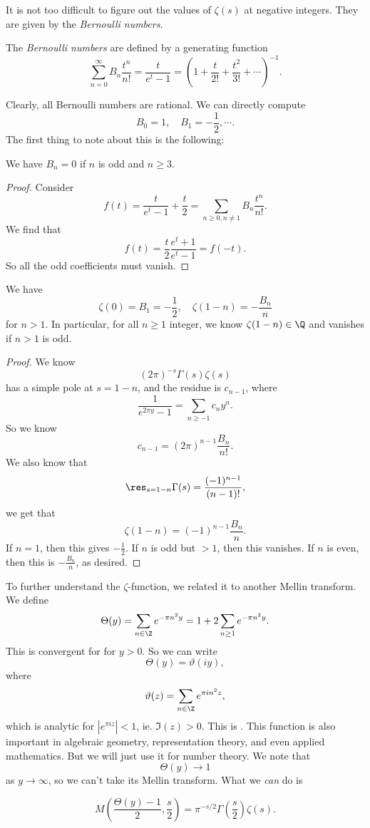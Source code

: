 \documentclass[a4paper]{article}
\begin{document}
It is not too difficult to figure out the values of $\zeta(s)$ at negative integers. They are given by the \emph{Bernoulli numbers}.
\begin{defi}
  The \emph{Bernoulli numbers} are defined by a generating function
  \[
    \sum_{n = 0}^\infty B_n \frac{t^n}{n!} = \frac{t}{e^t - 1} = \left(1 + \frac{t}{2!} + \frac{t^2}{3!} + \cdots\right)^{-1}.
  \]
\end{defi}

Clearly, all Bernoulli numbers are rational. We can directly compute
\[
  B_0 = 1, \quad B_1 = -\frac{1}{2}, \cdots.
\]
The first thing to note about this is the following:
\begin{prop}
  We have $B_n = 0$ if $n$ is odd and $n \geq 3$.
\end{prop}

\begin{proof}
  Consider
  \[
    f(t) = \frac{t}{e^t - 1} + \frac{t}{2} = \sum_{n \geq 0, n \not= 1} B_n \frac{t^n}{n!}.
  \]
  We find that
  \[
    f(t) = \frac{t}{2} \frac{e^t + 1}{e^t - 1} = f(-t).
  \]
  So all the odd coefficients must vanish.
\end{proof}

\begin{cor}
  We have
  \[
    \zeta(0) = B_1 = -\frac{1}{2},\quad \zeta(1 - n)= - \frac{B_n}{n}
  \]
  for $n > 1$. In particular, for all $n \geq 1$ integer, we know $\zeta(1 - n) \in \Q$ and vanishes if $n > 1$ is odd.
\end{cor}

\begin{proof}
  We know
  \[
    (2\pi)^{-s} \Gamma(s) \zeta(s)
  \]
  has a simple pole at $s = 1 - n$, and the residue is $c_{n - 1}$, where
  \[
    \frac{1}{e^{2\pi y} - 1} = \sum_{n \geq -1} c_n y^n.
  \]
  So we know
  \[
    c_{n - 1} = (2\pi)^{n - 1} \frac{B_n}{n!}.
  \]
  We also know that
  \[
    \res_{s = 1 - n} \Gamma(s) = \frac{(-1)^{n - 1}}{(n - 1)!},
  \]
  we get that
  \[
    \zeta(1 - n) = (-1)^{n - 1} \frac{B_n}{n}.
  \]
  If $n = 1$, then this gives $-\frac{1}{2}$. If $n$ is odd but $> 1$, then this vanishes. If $n$ is even, then this is $-\frac{B_n}{n}$, as desired.
\end{proof}

To further understand the $\zeta$-function, we related it to another Mellin transform. We define
\[
  \Theta(y) = \sum_{n \in \Z} e^{-\pi n^2 y} = 1 + 2 \sum_{n \geq 1} e^{-\pi n^2 y}.
\]
This is convergent for for $y > 0$. So we can write
\[
  \Theta(y) = \vartheta(iy),
\]
where
\[
  \vartheta(z) = \sum_{n \in \Z} e^{\pi i n^2 z},
\]
which is analytic for $|e^{\pi i z}| < 1$, ie. $\Im(z) > 0$. This is . This function is also important in algebraic geometry, representation theory, and even applied mathematics. But we will just use it for number theory. We note that
\[
  \Theta(y) \to 1
\]
as $y \to \infty$, so we can't take its Mellin transform. What we \emph{can} do is
\begin{prop}
  \[
    M\left(\frac{\Theta(y) - 1}{2}, \frac{s}{2}\right) = \pi^{-s/2} \Gamma\left(\frac{s}{2}\right) \zeta(s).
  \]
\end{prop}
\end{document}
